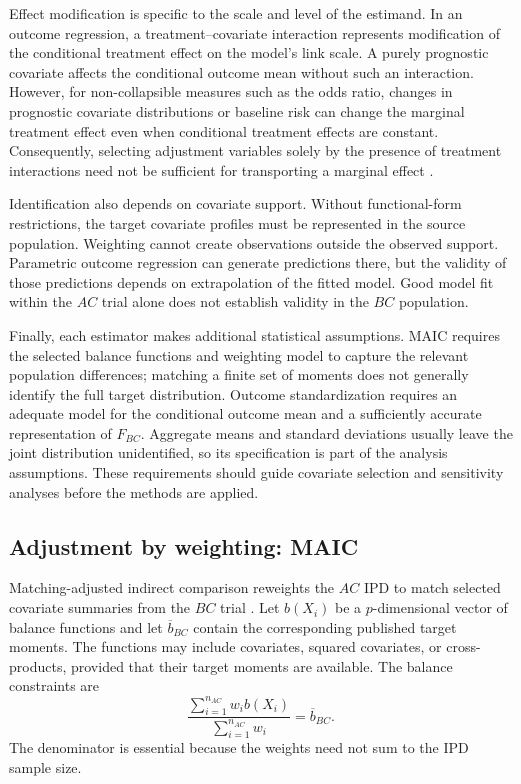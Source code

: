 \documentclass[article]{jss}
\begin{document}
Effect modification is specific to the scale and level of the estimand. In an outcome regression, a treatment--covariate interaction represents modification of the conditional treatment effect on the model's link scale. A purely prognostic covariate affects the conditional outcome mean without such an interaction. However, for non-collapsible measures such as the odds ratio, changes in prognostic covariate distributions or baseline risk can change the marginal treatment effect even when conditional treatment effects are constant. Consequently, selecting adjustment variables solely by the presence of treatment interactions need not be sufficient for transporting a marginal effect \citep{phillippo2025effect}.




Identification also depends on covariate support. Without functional-form restrictions, the target covariate profiles must be represented in the source population. Weighting cannot create observations outside the observed support. Parametric outcome regression can generate predictions there, but the validity of those predictions depends on extrapolation of the fitted model. Good model fit within the $AC$ trial alone does not establish validity in the $BC$ population.

Finally, each estimator makes additional statistical assumptions. MAIC requires the selected balance functions and weighting model to capture the relevant population differences; matching a finite set of moments does not generally identify the full target distribution. Outcome standardization requires an adequate model for the conditional outcome mean and a sufficiently accurate representation of $F_{BC}$. Aggregate means and standard deviations usually leave the joint distribution unidentified, so its specification is part of the analysis assumptions. These requirements should guide covariate selection and sensitivity analyses before the methods are applied.

\subsection{Adjustment by weighting: MAIC}
\label{sec:paic-methods}
\label{sec:maic}
Matching-adjusted indirect comparison reweights the $AC$ IPD to match selected covariate summaries from the $BC$ trial \citep{signorovitch2010}. Let $b(X_i)$ be a $p$-dimensional vector of balance functions and let $\overline b_{BC}$ contain the corresponding published target moments. The functions may include covariates, squared covariates, or cross-products, provided that their target moments are available. The balance constraints are
\begin{equation}
\label{eqn:maic-balance}
\frac{\sum_{i=1}^{n_{AC}}w_i b(X_i)}{\sum_{i=1}^{n_{AC}}w_i}
=\overline b_{BC}.
\end{equation}
The denominator is essential because the weights need not sum to the IPD sample size.
\end{document}
